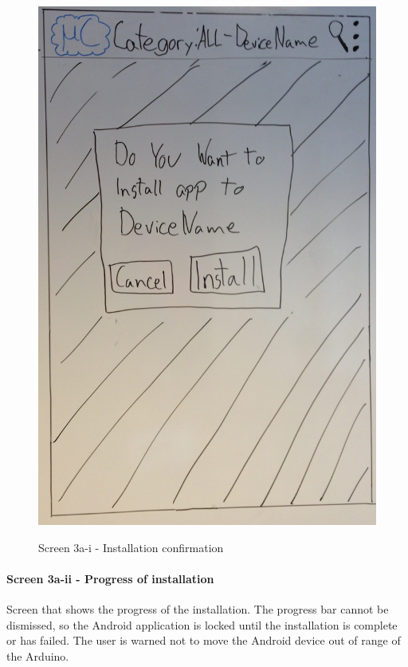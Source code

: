 \begin{figure}[H]
\centering
\includegraphics[scale=0.2]{images/Design_guide/Screen3a-i.png}
\label{fig:3a-i}
\caption{Screen 3a-i - Installation confirmation}
\end{figure}


\paragraph{Screen 3a-ii - Progress of installation}
Screen that shows the progress of the installation. The progress bar cannot be dismissed, so the Android application is locked until the installation is complete or has failed.
The user is warned not to move the Android device out of range of the Arduino.

